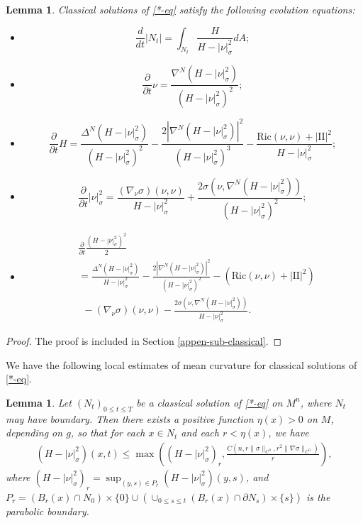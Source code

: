 \documentclass[11pt, letterpaper]{amsart}
\newtheorem{lem}[thm]{Lemma}
\theoremstyle{definition}
\theoremstyle{remark}
\begin{document}
\begin{lem}\label{evolution-eq-classical}
	Classical solutions of \ref{*-eq} satisfy the following evolution equations:
	\begin{itemize}
		\item[1)]
			$$\frac{d}{d t}|N_t| = \int_{N_t} \frac{H}{H- |\nu |^2_{\sigma }} dA;$$
		\item[2)]
			$$\frac{\partial }{\partial  t} \nu =   \frac{  \nabla ^{N}( H- |\nu |^2_{\sigma } )}{(H- |\nu |^2_{\sigma })^2}  ;$$
		\item[3)]
			$$\frac{\partial }{\partial t}H =   \frac{\Delta ^{N} (H-|\nu |^2_{\sigma }) }{(H-|\nu |^2_{\sigma })^2} - \frac{2|\nabla ^{N} (H- |\nu |^2_{\sigma })|^2}{(H-|\nu |^2_{\sigma })^3} - \frac{\mathrm{Ric}(\nu ,\nu ) + |\mathrm{II}|^2}{H-|\nu |^2_{\sigma }};$$
		\item[4)]
			$$\frac{\partial }{\partial  t} |\nu |_{\sigma }^2 = \frac{(\nabla _{\nu } \sigma ) (\nu , \nu )}{H- |\nu |^2_{\sigma }} + \frac{2 \sigma(\nu ,\nabla ^{N}(H- |\nu |^2_{\sigma }) )}{(H- |\nu |^2_{\sigma })^2};$$
		\item[5)]
			\begin{align*}
				&\frac{\partial }{\partial t}\frac{(H - |\nu |^2_{\sigma })^2}{2} \\
				&= \frac{\Delta ^{N} (H- |\nu |^2_{\sigma })}{H- |\nu |^2_{\sigma }} - \frac{2|\nabla ^{N}(H-|\nu |^2_{\sigma })|^2}{(H- |\nu |^2_{\sigma })^2} - \left( \mathrm{Ric}(\nu ,\nu ) + |\mathrm{II}|^2 \right)\\
				&\ \ - (\nabla _{\nu }\sigma )(\nu ,\nu ) - \frac{2\sigma ( \nu , \nabla ^{N}(H-|\nu |^2_{\sigma }) )}{H-|\nu |^2_{\sigma }}.
			\end{align*} 
	\end{itemize}
\end{lem}
\begin{proof}
	The proof is included in Section \ref{appen-sub-classical}. 
\end{proof}

We have the following local estimates of mean curvature for classical solutions of \ref{*-eq}.
\begin{lem}\label{local-estimate-mean-curv}
Let $(N_t)_{0 \leq t \leq T}$ be a classical solution of \ref{*-eq} on $M^{n}$, where $N_t$ may have boundary. Then there exists a positive function $\eta (x) >0$ on $M$, depending on $g$, so that for each $x \in N_t$ and each $r< \eta(x)$, we have 
	\begin{align}
		(H - |\nu |^2_{\sigma })(x, t) \leq \max \left( (H-|\nu |^2_{\sigma })_r, \frac{C(n, r \|\sigma \|_{C^0}, r ^2 \|\nabla \sigma \|_{C^0})}{r} \right) ,
	\end{align}
	where $ (H-|\nu |^2_{\sigma })_r = \sup_{(y,s) \in P_r} (H-|\nu |^2_{\sigma })(y,s)$, and $P_r = (B_r(x) \cap N_0) \times \{0\} \cup \left( \cup _{0 \leq s \leq t}(B_r(x)\cap \partial N_s) \times \{ s\}  \right) $ is the parabolic boundary. 
\end{lem}
\end{document}
